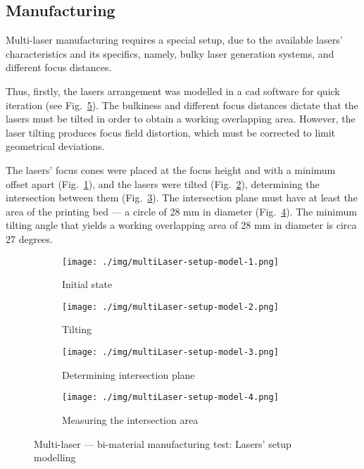 \subsection{Manufacturing}%
\label{sec:manufacturing-multiLaser}
Multi-laser manufacturing requires a special setup, due to the available lasers'
characteristics and its specifics, namely, bulky laser generation systems, and
different focus distances.

Thus, firstly, the lasers arrangement was modelled in a
\gls{cad} software for quick iteration (see Fig.~\ref{fig:multiLaser-setup-model}).
The bulkiness and different
focus distances dictate that the lasers must be tilted in order to obtain a
working overlapping area. However, the laser tilting produces focus
field distortion, which must be corrected to limit geometrical deviations.

The lasers' focus cones were placed at the focus height and with a minimum
offset apart (Fig.~\ref{fig:multiLaser-setup-model-1}), and the lasers were
tilted (Fig.~\ref{fig:multiLaser-setup-model-2}), determining the
intersection between them (Fig.~\ref{fig:multiLaser-setup-model-3}). The intersection plane must have at least the area of
the printing bed --- a circle of 28 mm in diameter (Fig.~\ref{fig:multiLaser-setup-model-4}). The minimum tilting angle
that yields a working overlapping area of 28 mm in diameter is circa 27 degrees.

\begin{figure}[htbp!]
%
  \begin{subfigure}[t]{0.48\textwidth}
    \centering
  \texttt{[image: ./img/multiLaser-setup-model-1.png]}
  \caption{Initial state}%
  \label{fig:multiLaser-setup-model-1}
\end{subfigure}
%
  \begin{subfigure}[t]{0.48\textwidth}
  \centering
  \texttt{[image: ./img/multiLaser-setup-model-2.png]}
  \caption{Tilting}%
  \label{fig:multiLaser-setup-model-2}
  \end{subfigure}
%
  \begin{subfigure}[t]{.48\textwidth}
  \centering
    \texttt{[image: ./img/multiLaser-setup-model-3.png]}
  \caption{Determining intersection plane}%
  \label{fig:multiLaser-setup-model-3}
  \end{subfigure}
%
  \centering
  \begin{subfigure}[t]{.48\textwidth}
    \texttt{[image: ./img/multiLaser-setup-model-4.png]}
  \caption{Measuring the intersection area}%
  \label{fig:multiLaser-setup-model-4}
  \end{subfigure}
  \centering
  \caption{Multi-laser --- bi-material manufacturing test: Lasers' setup modelling}%
  \label{fig:multiLaser-setup-model}
\end{figure}

